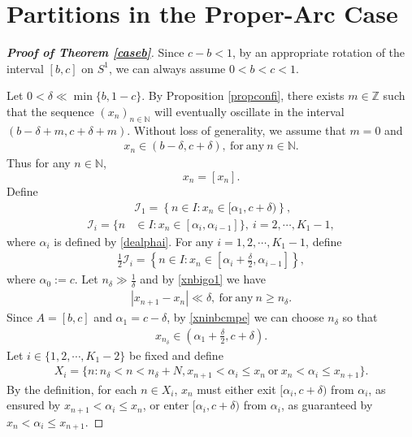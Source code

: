 \documentclass[12pt]{amsart}
\newcommand{\abs}[1]{\left\lvert #1 \right\rvert}
\theoremstyle{plain}
\newcommand{\Z}{\mathbb{Z}}
\theoremstyle{definition}
\begin{document}
\section{Partitions in the Proper-Arc Case}\label{pcb}
\begin{proof}[\textbf{Proof of Theorem \ref{caseb}}] 
Since $c-b<1$,	by an appropriate rotation of the interval 
$[b,c]$ on $S^1$, we can always assume $0<b<c<1$. 

Let $0<\delta\ll\min\{b,1-c\}$. By Proposition \ref{propconfi}, there exists  $m\in \Z$ such that the sequence $(x_n)_{n\in\mathbb{N}}$ will eventually oscillate in the interval $(b-\delta+m,c+\delta+m)$. Without loss of generality, we assume that $m=0$ and
\begin{align}
	x_n\in (b-\delta,c+\delta),\ \mathrm{for\ any\ }n\in\mathbb{N}.\label{xninbcmpe}
\end{align}
Thus for any $n\in\mathbb{N}$, $$
	x_n=[x_n].$$
	Define
	\begin{align}
		&\mathcal{I}_1=\left\{n\in I:x_n\in[\alpha_1,c+\delta)\right\},\label{cbdmi1}\\
		\mathcal{I}_i=\{n&\in I:x_n\in[\alpha_i,\alpha_{i-1}]\},\ i=2,\cdots,K_1-1,\label{cbdmii}
	\end{align}
	where $\alpha_i$ is defined by \eqref{dealphai}. For any $i=1,2,\cdots,K_1-1$, define
	\begin{align}
		\frac{1}{2}\mathcal{I}_i=\left\{n\in I:x_n\in\left[\alpha_{i}+\frac{\delta}{2},\alpha_{i-1}\right] \right\},\label{cbdhalfmii}
	\end{align}
	where $\alpha_0:=c$.
	Let $n_\delta\gg \frac{1}{\delta}$ and by \eqref{xnbigo1} we have
	\begin{align}
		\abs{x_{n+1}-x_n}\ll \delta,\ \mathrm{for\ any}\ n\geq n_\delta.\label{cbxn1xnlle}
	\end{align}
	Since $A=[b,c]$ and $\alpha_1=c-\delta$, by \eqref{xninbcmpe} we can choose $n_\delta$ so that 
	\begin{align}
		x_{n_\delta}\in \left(\alpha_1+\frac{\delta}{2},c+\delta\right).\label{cbxnein}
	\end{align}
	Let $i\in\{1,2,\cdots,K_1-2\}$ be fixed and define
	\begin{align}
		X_i=\{n:n_\delta< n<n_\delta+N, x_{n+1}<\alpha_i\leq x_n\ \mathrm{or}\ x_n< \alpha_i\leq x_{n+1}\}.\label{dxicb}
	\end{align}
By the definition, for each $n\in X_i$,  $x_n$ must either exit
$[\alpha_i,c+\delta)$ from $\alpha_i$, as ensured by $x_{n+1}<\alpha_i\leq x_n$, or enter
$[\alpha_i,c+\delta)$ from $\alpha_i$, as guaranteed by $x_n<\alpha_i\leq x_{n+1}$. 



\end{proof}
\end{document}
